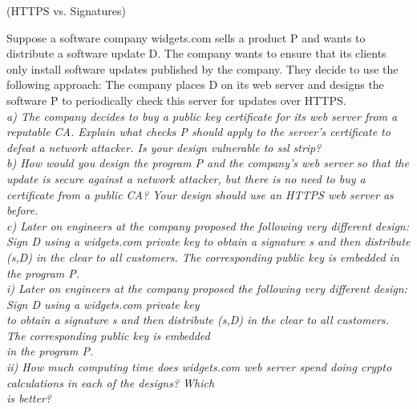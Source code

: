 \begin{prob}  (HTTPS vs. Signatures)
\end{prob}

\noindent Suppose a software company widgets.com sells a product P and wants to distribute a software update D. The company wants to ensure that its clients only install software updates published by the company. They decide to use the following approach: The company places D on its web server and designs the software P to periodically check this server for updates over HTTPS.\\

\noindent \textit{a) The company decides to buy a public key certificate for its web server from a reputable CA. Explain what checks P should apply to the server's certificate to defeat a network attacker. Is your design vulnerable to ssl strip?}\\

\noindent \textit{b) How would you design the program P and the company's web server so that the update is secure against a network attacker, but there is no need to buy a certificate from a public CA? Your design should use an HTTPS web server as before.}\\

\noindent \textit{c) Later on engineers at the company proposed the following very different design: Sign D using a widgets.com private key to obtain a signature s and then distribute (s,D) in the clear to all customers. The corresponding public key is embedded in the program P.}\\

\textit{i) Later on engineers at the company proposed the following very different design: Sign D using a widgets.com private key\\\indent to obtain a signature s and then distribute (s,D) in the clear to all customers. The corresponding public key is embedded\\\indent in the program P.}\\

\textit{ii) How much computing time does widgets.com web server spend doing crypto calculations in each of the designs? Which\\\indent is better?}\\

